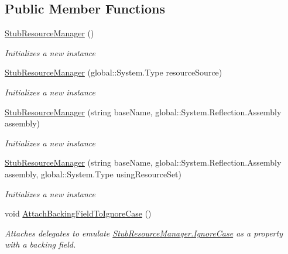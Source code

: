 \subsection*{Public Member Functions}
\begin{DoxyCompactItemize}
\item 
\hyperlink{class_system_1_1_resources_1_1_fakes_1_1_stub_resource_manager_a480b34fb949d1542e823a23f5ba1e3b1}{Stub\-Resource\-Manager} ()
\begin{DoxyCompactList}\small\item\em Initializes a new instance\end{DoxyCompactList}\item 
\hyperlink{class_system_1_1_resources_1_1_fakes_1_1_stub_resource_manager_ad7dd9d017dfa9be40190d3eba71691e8}{Stub\-Resource\-Manager} (global\-::\-System.\-Type resource\-Source)
\begin{DoxyCompactList}\small\item\em Initializes a new instance\end{DoxyCompactList}\item 
\hyperlink{class_system_1_1_resources_1_1_fakes_1_1_stub_resource_manager_a963a89494040239fdecf7c5514795416}{Stub\-Resource\-Manager} (string base\-Name, global\-::\-System.\-Reflection.\-Assembly assembly)
\begin{DoxyCompactList}\small\item\em Initializes a new instance\end{DoxyCompactList}\item 
\hyperlink{class_system_1_1_resources_1_1_fakes_1_1_stub_resource_manager_a97627799ce252ac0ef631fb03d1811fa}{Stub\-Resource\-Manager} (string base\-Name, global\-::\-System.\-Reflection.\-Assembly assembly, global\-::\-System.\-Type using\-Resource\-Set)
\begin{DoxyCompactList}\small\item\em Initializes a new instance\end{DoxyCompactList}\item 
void \hyperlink{class_system_1_1_resources_1_1_fakes_1_1_stub_resource_manager_a1f98f15a98407944a9b510b62c227faf}{Attach\-Backing\-Field\-To\-Ignore\-Case} ()
\begin{DoxyCompactList}\small\item\em Attaches delegates to emulate \hyperlink{class_system_1_1_resources_1_1_fakes_1_1_stub_resource_manager_a535fc71bed9718a32c2a5dff6a54eff5}{Stub\-Resource\-Manager.\-Ignore\-Case} as a property with a backing field.\end{DoxyCompactList}\item 

\end{DoxyCompactItemize}
